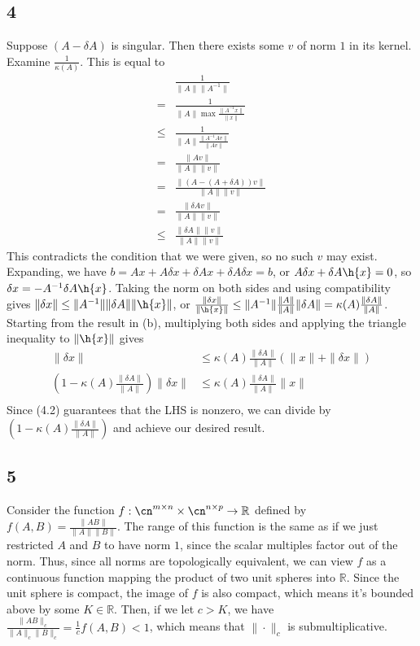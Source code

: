 \documentclass{article}
\newcommand{\rn}{\mathbb{R}}
\begin{document}
\subsection*{4}
Suppose $(A-\delta A)$ is singular. Then there exists some $v$ of norm $1$ in its kernel. Examine $\frac{1}{\kappa(A)}$. This is equal to
\begin{align*}
    &\frac{1}{\|A\|\|A^{-1}\|}\\
    =&\frac{1}{\|A\|\max\frac{\|A^{-1}x\|}{\|x\|}}\\
    \leq&\frac{1}{\|A\|\frac{\|A^{-1}Av\|}{\|Av\|}}\\
    =&\frac{\|Av\|}{\|A\|\|v\|}\\
    =&\frac{\|(A-(A+\delta A))v\|}{\|A\|\|v\|}\\
    =&\frac{\|\delta Av\|}{\|A\|\|v\|}\\
    \leq&\frac{\|\delta A\|\|v\|}{\|A\|\|v\|}
\end{align*}
This contradicts the condition that we were given, so no such $v$ may exist.
Expanding, we have $b=Ax+A\delta x+\delta Ax + \delta A\delta x=b$, or $A\delta x+\delta A\h{x}=0$, so $\delta x=-A^{-1}\delta A\h{x}$. Taking the norm on both sides and using compatibility gives $\|\delta x\|\leq\|A^{-1}\|\|\delta A\|\|\h{x}\|$, or $\frac{\|\delta x\|}{\|\h{x}\|}\leq\|A^{-1}\|\frac{\|A\|}{\|A\|}\|\delta A\|=\kappa(A)\frac{\|\delta A\|}{\|A\|}$.
Starting from the result in (b), multiplying both sides and applying the triangle inequality to $\|\h{x}\|$ gives 
\begin{align*}
    \|\delta x\|&\leq\kappa(A)\frac{\|\delta A\|}{\|A\|}(\|x\|+\|\delta x\|)\\
    \left(1-\kappa(A)\frac{\|\delta A\|}{\|A\|}\right)\|\delta x\|&\leq\kappa(A)\frac{\|\delta A\|}{\|A\|}\|x\|\\
\end{align*}
Since (4.2) guarantees that the LHS is nonzero, we can divide by $\left(1-\kappa(A)\frac{\|\delta A\|}{\|A\|}\right)$ and achieve our desired result.
\subsection*{5}
Consider the function $f:\cn^{m\times n}\times\cn^{n\times p}\to\rn$ defined by $f(A,B)=\frac{\|AB\|}{\|A\|\|B\|}$. The range of this function is the same as if we just restricted $A$ and $B$ to have norm $1$, since the scalar multiples factor out of the norm. Thus, since all norms are topologically equivalent, we can view $f$ as a continuous function mapping the product of two unit spheres into $\rn$. Since the unit sphere is compact, the image of $f$ is also compact, which means it's bounded above by some $K\in\rn$. Then, if we let $c>K$, we have $\frac{\|AB\|_c}{\|A\|_c\|B\|_c}=\frac{1}{c}f(A,B)<1$, which means that $\|\cdot\|_c$ is submultiplicative.
\end{document}
